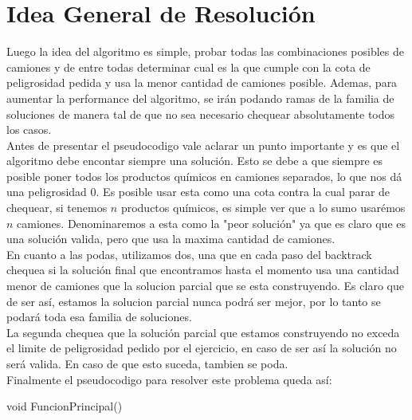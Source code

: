 \section{Idea General de Resoluci\'on}
Luego la idea del algoritmo es simple, probar todas las combinaciones posibles de camiones y de entre todas determinar cual es la que cumple con la cota de peligrosidad pedida y usa la menor cantidad de camiones posible. Ademas, para aumentar la performance del algoritmo, se ir\'an podando ramas de la familia de soluciones de manera tal de que no sea necesario chequear absolutamente todos los casos.
\\
Antes de presentar el pseudocodigo vale aclarar un punto importante y es que el algoritmo debe encontar siempre una soluci\'on. Esto se debe a que siempre es posible poner todos los productos qu\'imicos en camiones separados, lo que nos d\'a  una peligrosidad $0$. Es posible usar esta como una cota contra la cual parar de chequear, si tenemos $n$ productos qu\'imicos, es simple ver que a lo sumo usar\'emos $n$ camiones. Denominaremos a esta como la "peor soluci\'on" ya que es claro que es una soluci\'on valida, pero que usa la maxima cantidad de camiones.
\\
En cuanto a las podas, utilizamos dos, una que en cada paso del backtrack chequea si la soluci\'on final que encontramos hasta el momento usa una cantidad menor de camiones que la solucion parcial que se esta construyendo. Es claro que de ser as\'i, estamos la solucion parcial nunca podr\'a ser mejor, por lo tanto se podar\'a toda esa familia de soluciones.
\\
La segunda chequea que la soluci\'on parcial que estamos construyendo no exceda el limite de peligrosidad pedido por el ejercicio, en caso de ser as\'i la soluci\'on no ser\'a valida. En caso de que esto suceda, tambien se poda.
\\
Finalmente el pseudocodigo para resolver este problema queda as\'i:

\begin{algorithm}
\begin{algorithmic}[1]\parskip=1mm
\caption{void FuncionPrincipal()}

  
  
  
 
 \end{algorithmic}
\end{algorithm}

